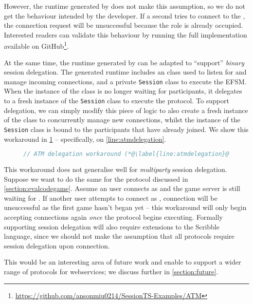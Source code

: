 However, the runtime generated by \nodecodegen
does not make this assumption, so we do not get
the behaviour intended by the developer. If a second
 tries to connect to the ,
the connection request will be unsuccessful because
the role is already occupied.
Interested readers can validate this
behaviour by running the full implementation available
on GitHub\footnote{
\url{https://github.com/ansonmiu0214/SessionTS-Examples/ATM}
}.

At the same time, the runtime generated by \nodecodegen
can be adapted to ``support'' \textit{binary} session delegation.
The generated runtime includes
an  class used to listen for
and manage incoming connections, and a
private \texttt{Session} class to execute the EFSM.
When the instance of the  class
is no longer waiting for participants,
it delegates to a fresh instance of the \texttt{Session} class
to execute the protocol.
To support delegation, we can simply modify this piece of 
logic to also create a fresh instance of the 
class to concurrently manage new connections, whilst the
instance of the \texttt{Session} class is bound to the
participants that have already joined.
We show this workaround in \cref{lst:atmdelegation} -- 
specifically, on \cref{line:atmdelegation}.

\begin{figure}[!h]
\begin{lstlisting}[language=javascript]
// ATM delegation workaround (*@\label{line:atmdelegation}@*)
\end{lstlisting}
\label{lst:atmdelegation}
\end{figure}

This workaround does not generalise well for
\textit{multiparty} session delegation. 
Suppose we want to do the same for the 
 protocol discussed
in \cref{section:evalcodegame}.
Assume an user connects as  and the game server
is still waiting for . If another user attempts
to connect as , connection will be unsuccessful
as the first game hasn't began yet -- this workaround will
only begin accepting connections again \textit{once}
the protocol begins executing.
Formally supporting session delegation will also require
extensions to the Scribble language, since we should not
make the assumption that all protocols require
session delegation upon connection.

This would be an interesting area of future work and
enable \codegen to support a wider range of protocols
for webservices; we discuss further in \cref{section:future}.